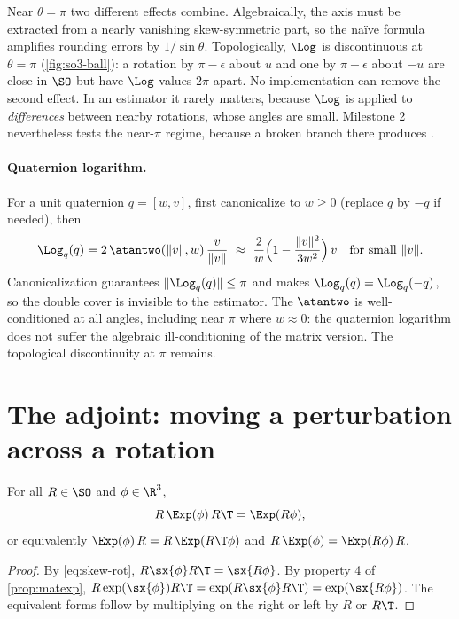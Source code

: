 \begin{remark}
Near $\theta = \pi$ two different effects combine. Algebraically, the axis must be extracted from a
nearly vanishing skew-symmetric part, so the na\"ive formula amplifies rounding errors by
$1/\sin\theta$. Topologically, $\Log$ is discontinuous at $\theta = \pi$ (\cref{fig:so3-ball}): a
rotation by $\pi - \epsilon$ about $u$ and one by $\pi - \epsilon$ about $-u$ are close in $\SO$ but have
$\Log$ values $2\pi$ apart. No implementation can remove the second effect. In an estimator it rarely
matters, because $\Log$ is applied to \emph{differences} between nearby rotations, whose angles are
small. Milestone 2 nevertheless tests the near-$\pi$ regime, because a broken branch there produces
.
\end{remark}

\paragraph{Quaternion logarithm.} For a unit quaternion $q = [w, v]$, first canonicalize to $w \ge 0$ (replace
$q$ by $-q$ if needed), then
\begin{equation}
  \Log_q(q) = 2\,\atantwo(\|v\|, w)\,\frac{v}{\|v\|}
  \ \approx\ \frac{2}{w}\Big(1 - \frac{\|v\|^2}{3w^2}\Big)\,v \quad\text{for small }\|v\|.
  \label{eq:Logq}
\end{equation}
Canonicalization guarantees $\|\Log_q(q)\| \le \pi$ and makes $\Log_q(q) = \Log_q(-q)$, so the double cover is
invisible to the estimator. The $\atantwo$ is well-conditioned at all angles, including near $\pi$ where
$w \approx 0$: the quaternion logarithm does not suffer the algebraic ill-conditioning of the matrix version.
The topological discontinuity at $\pi$ remains.

\section{The adjoint: moving a perturbation across a rotation}

\begin{proposition}[Adjoint of $\SO$]
\label{prop:adjoint}
For all $R \in \SO$ and $\phi \in \R^3$,
\begin{equation}
  R\,\Exp(\phi)\,R\T = \Exp(R\phi),
  \label{eq:adjoint}
\end{equation}
or equivalently $\Exp(\phi)\,R = R\,\Exp(R\T\phi)$ and $R\,\Exp(\phi) = \Exp(R\phi)\,R$.
\end{proposition}
\begin{proof}
By \eqref{eq:skew-rot}, $R\sx{\phi}R\T = \sx{R\phi}$. By property 4 of \cref{prop:matexp},
$R\exp(\sx{\phi})R\T = \exp(R\sx{\phi}R\T) = \exp(\sx{R\phi})$. The equivalent forms follow by
multiplying on the right or left by $R$ or $R\T$.
\end{proof}

